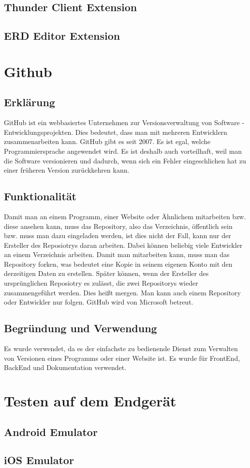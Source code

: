 \subsection{Thunder Client Extension}
\author{Stefano Pyringer}
\lipsum[5-10]

\subsection{ERD Editor Extension}
\author{Stefano Pyringer}
\lipsum[5-10]

\section{Github}
\author{Mirzet Sakonjic}
\subsection*{Erklärung}
GitHub ist ein webbasiertes Unternehmen zur Versionsverwaltung von Software - Entwicklungsprojekten. Dies bedeutet, dass man mit mehreren Entwicklern zusammenarbeiten kann. GitHub
gibt es seit 2007. Es ist egal, welche Programmiersprache angewendet wird. Es ist
deshalb auch vorteilhaft, weil man die Software versionieren und dadurch, wenn sich
ein Fehler eingeschlichen hat zu einer früheren Version zurückkehren kann.
\subsection*{Funktionalität}
Damit man an einem Programm, einer Website oder Ähnlichem mitarbeiten bzw. diese
ansehen kann, muss das Repository, also das Verzeichnis, öffentlich sein bzw. muss man
dazu eingeladen werden, ist dies nicht der Fall, kann nur der Ersteller des Reposiotrys
daran arbeiten.
Dabei können beliebig viele Entwickler an einem Verzeichnis arbeiten. Damit man
mitarbeiten kann, muss man das Repository forken, was bedeutet eine Kopie in seinem
eigenen Konto mit den derzeitigen Daten zu erstellen.
Später können, wenn der Ersteller des ursprünglichen Reposiotry es zulässt, die zwei
Repositorys wieder zusammengeführt werden. Dies heißt mergen. Man kann auch einem
Repository oder Entwickler nur folgen. GitHub wird von Microsoft betreut.
\subsection*{Begründung und Verwendung}
Es wurde verwendet, da es der einfachste zu bedienende Dienst zum Verwalten von
Versionen eines Programms oder einer Website ist. Es wurde für FrontEnd, BackEnd
und Dokumentation verwendet.

\section{Testen auf dem Endgerät}
\subsection{Android Emulator}
\subsection{iOS Emulator}